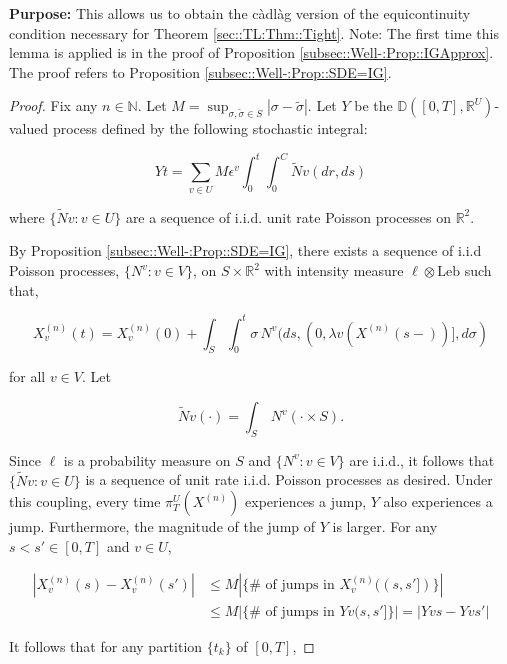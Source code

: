 \documentclass[12pt]{article}
\newcommand{\mb}{\mathbb}
\newcommand{\te}{\text}
\newcommand{\ep}{\epsilon}
\newcommand{\purpose}{\textbf{Purpose: }}
\newcommand{\ind}{\hspace{24pt}}
\newcommand{\cad}{\mb{D}}							%
\renewcommand{\v}{v}							%
\renewcommand{\U}{U}							%
\renewcommand{\S}{S}							%
\newcommand{\s}{\sigma}							%
\newcommand{\ev}{\ep}							%
\newcommand{\T}{T}								%
\renewcommand{\t}{t}							%
\newcommand{\proj}{\pi}							%
\renewcommand{\tt}{s}							%
\newcommand{\ttt}{s'}							%
\newcommand{\X}{X}								%
\newcommand{\vind}[1]{^{#1}}					%
\newcommand{\vsi}[1]{^{#1}}						%
\newcommand{\cind}[1]{_{#1}}					%
\newcommand{\tp}[1]{(#1)}						%
\newcommand{\tip}[1]{#1}						%
\newcommand{\ts}[1]{_{#1}}						%
\newcommand{\const}{C}							%
\newcommand{\sln}[1]{^{(#1)}}						%
\renewcommand{\ss}{\tilde{\s}}					%
\newcommand{\poiss}{N}							%
\newcommand{\leb}{\te{Leb}}						%
\newcommand{\Sm}{\ell}							%
\newcommand{\rate}{\lambda}						%
\renewcommand{\r}{r}							%
\newcommand{\cconst}{M}							%
\newcommand{\alt}[1]{\widetilde{#1}}			%
\newcommand{\indx}[1]{_{#1}}					%
\newcommand{\XX}{Y}								%
\renewcommand{\it}{k}							%
\begin{document}
\purpose This allows us to obtain the c\`adl\`ag version of the equicontinuity condition necessary for Theorem \ref{sec::TL:Thm::Tight}. Note: The first time this lemma is applied is in the proof of Proposition \ref{subsec::Well-:Prop::IGApprox}. The proof refers to Proposition \ref{subsec::Well-:Prop::SDE=IG}.

\begin{proof}
Fix any \(n \in \mb{N}\). Let \(\cconst = \sup_{\s,\ss \in \S} |\s - \ss|\). Let \(\XX{}{}\) be the \(\cad([0,\T],\mb{R}^\U)\)-valued process defined by the following stochastic integral:

\[\XX{}{\t} = \sum_{\v \in \U}\cconst\ev\vind{\v}\int_0^\t\int_0^{\const\indx{}}\alt{\poiss}{\v}(d\r, d\tt)\]

where \(\{\alt{\poiss}{\v}:\v \in \U\}\) are a sequence of i.i.d. unit rate Poisson processes on \(\mb{R}^2\). 

\ind By Proposition \ref{subsec::Well-:Prop::SDE=IG}, there exists a sequence of i.i.d Poisson processes, \(\{\poiss\vind{\v}:\v\in V\}\), on \(\S\times\mb{R}^2\) with intensity measure \(\Sm\otimes \leb\) such that,

\[\X\sln{n}\cind{\v}\tp{\t} = \X\sln{n}\cind{\v}\tp{0} + \int_\S\int_0^\t \s\,\poiss\vind{\v}(d\tt,(0,\rate{\v}(\X\sln{n}\cind{}\tp{\tt-})],d\s)\]

for all \(\v\in V\). Let

\[\alt{\poiss}{\v}(\cdot) = \int_\S\,\poiss\vind{\v}(\cdot\times \S).\]

Since \(\Sm\) is a probability measure on \(\S\) and \(\{\poiss\vind{\v}:\v\in V\}\) are i.i.d., it follows that \(\{\alt{\poiss}{\v}:\v\in \U\}\) is a sequence of unit rate i.i.d. Poisson processes as desired. Under this coupling, every time \(\proj\vsi{\U}\ts{\T}(\X\sln{n}\cind{}\tip{})\) experiences a jump, \(\XX{}{}\) also experiences a jump. Furthermore, the magnitude of the jump of \(\XX{}{}\) is larger. For any \(\tt<\ttt\in [0,\T]\) and \(\v\in \U\),

\begin{align*}
|\X\sln{n}\cind{\v}\tp{\tt} - \X\sln{n}\cind{\v}\tp{\ttt}|&\leq \cconst\left|\{\#\te{ of jumps in }\X\sln{n}\cind{\v}\tp{(\tt,\ttt]}\}\right| \\
&\leq \cconst\left|\{\#\te{ of jumps in }\XX{\v}{(\tt,\ttt]}\}\right| = \left|\XX{\v}{\tt} - \XX{\v}{\ttt}\right|
\end{align*}

It follows that for any partition \(\{\t\indx{\it}\}\) of \([0,\T]\),


\end{proof}
\end{document}
